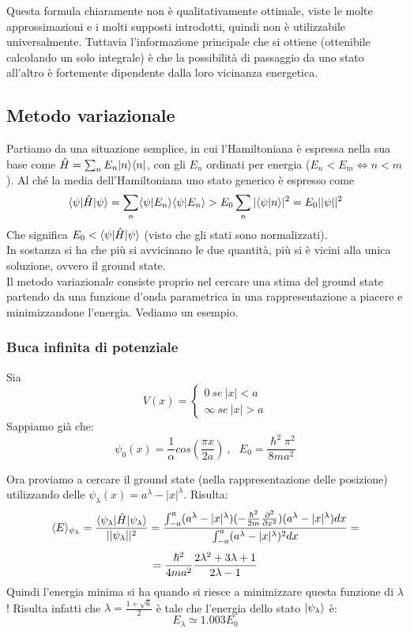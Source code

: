 Questa formula chiaramente non è qualitativamente ottimale, viste le molte approssimazioni e i molti supposti introdotti, quindi non è utilizzabile universalmente. Tuttavia l'informazione principale che si ottiene (ottenibile calcolando un solo integrale) è che la possibilità di passaggio da uno stato all'altro è fortemente dipendente dalla loro vicinanza energetica.

\subsection{Metodo variazionale}
Partiamo da una situazione semplice, in cui l'Hamiltoniana è espressa nella sua base come $\H = \sum_n E_n \ketbra n n$, con gli $E_n$ ordinati per energia ($E_n < E_m \Leftrightarrow n < m$). Al ché la media dell'Hamiltoniana uno stato generico è espresso come
\[
	\Bra \psi \H \Ket \psi = \sum_n \braket \psi {E_n} \braket \psi {E_n} > E_0 \sum_n |\braket{\psi}{n}|^2 = E_0 \sfabs{\psi}
\]
Che significa $E_0 < \braketin \psi \H \psi$ (visto che gli stati sono normalizzati).\\
In sostanza si ha che più si avvicinano le due quantità, più si è vicini alla unica soluzione, ovvero il ground state.\\
Il metodo variazionale consiste proprio nel cercare una stima del ground state partendo da una funzione d'onda parametrica in una rappresentazione a piacere e minimizzandone l'energia. Vediamo un esempio.

\subsubsection*{Buca infinita di potenziale}
Sia
\[
	V(x) = \begin{cases}
		0 \ se \  |x| < a\\
		\infty \ se \  |x| > a
	\end{cases}
\]
Sappiamo già che:
\[
	\psi_0(x) = \frac{1}{\alpha}cos(\frac{\pi x}{2 a})\ ,\ \ \ E_0 = \frac{\hslash^2 \pi^2}{8ma^2}
\]

Ora proviamo a cercare il ground state (nella rappresentazione delle posizione) utilizzando delle $\psi_\lambda(x) = a^\lambda - |x|^\lambda$. Risulta:
\[
	\avg[\psi_\lambda] E = \frac{\Bra {\psi_\lambda} \H \Ket {\psi_\lambda}}{\sfabs {\psi_\lambda}} = \frac{\int_{-a}^a (a^\lambda - |x|^\lambda)(-\frac{\hslash^2}{2m}\sderiv[x]{})(a^\lambda - |x|^\lambda) dx}{\int_{-a}^a(a^\lambda - |x|^\lambda)^2 dx} = \]\[
	= \frac{\h^2}{4ma^2}\frac{2\lambda^2 + 3\lambda + 1}{2\lambda - 1}
\]
Quindi l'energia minima si ha quando si riesce a minimizzare questa funzione di $\lambda$! Risulta infatti che $\lambda = \frac{1+\sqrt 6}{2}$ è tale che l'energia dello stato $\Ket {\psi_\lambda}$ è:
\[
	E_\lambda \simeq	  1.003 E_0
\]

